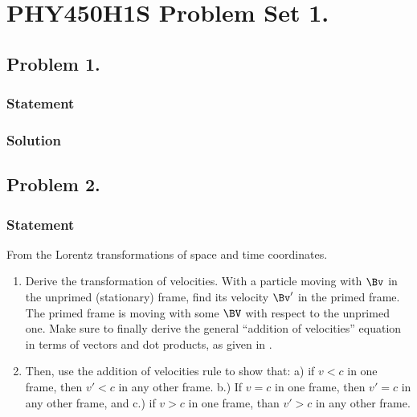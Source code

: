 %


\author{Peeter Joot}

\chapter{PHY450H1S Problem Set 1.}
\label{chap:relElectroDynProblemSet1}
\date{Jan 22, 2011}

\beginArtNoToc
%

\section{Problem 1.}
\subsection{Statement}
\subsection{Solution}

\section{Problem 2.}
\subsection{Statement}

From the Lorentz transformations of space and time coordinates.

\begin{enumerate}
\item Derive the transformation of velocities.  With a particle moving with $\Bv$ in the unprimed (stationary) frame, find its velocity $\Bv'$ in the primed frame.  The primed frame is moving with some $\BV$ with respect to the unprimed one.  Make sure to finally derive the general ``addition of velocities'' equation in terms of vectors and dot products, as given in \cite{landau1971classical}.
\item Then, use the addition of velocities rule to show that: a) if $v < c$ in one frame, then $v' < c$ in any other frame.  b.) If $v = c$ in one frame, then $v' = c$ in any other frame, and c.) if $v> c$ in one frame, than $v' > c$ in any other frame.
\end{enumerate}

